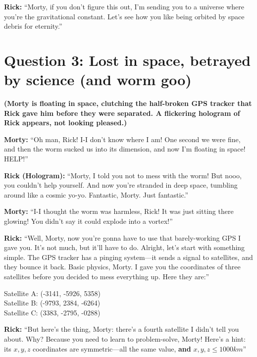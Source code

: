\documentclass[a4paper, 12pt]{exam}
\begin{document}
\bigskip

\noindent \textbf{Rick:} “Morty, if you don’t figure this out, I’m sending you to a universe where you’re the gravitational constant. Let’s see how you like being orbited by space debris for eternity.”

	
	\pagebreak
	

\section*{Question 3: Lost in space, betrayed by science (and worm goo)}

\noindent \textbf{(Morty is floating in space, clutching the half-broken GPS tracker that Rick gave him before they were separated. A flickering hologram of Rick appears, not looking pleased.)}

\bigskip
\noindent \textbf{Morty:} “Oh man, Rick! I-I don’t know where I am! One second we were fine, and then the worm sucked us into its dimension, and now I’m floating in space! HELP!” \bigskip

\noindent \textbf{Rick (Hologram):} “Morty, I told you not to mess with the worm! But nooo, you couldn’t help yourself. And now you’re stranded in deep space, tumbling around like a cosmic yo-yo. Fantastic, Morty. Just fantastic.” \bigskip

\noindent \textbf{Morty:} “I-I thought the worm was harmless, Rick! It was just sitting there glowing! You didn’t say it could explode into a vortex!” 

\bigskip

\noindent \textbf{Rick:} “Well, Morty, now you’re gonna have to use that barely-working GPS I gave you. It’s not much, but it’ll have to do. Alright, let’s start with something simple. The GPS tracker has a pinging system—it sends a signal to satellites, and they bounce it back. Basic physics, Morty. I gave you the coordinates of three satellites before you decided to mess everything up. Here they are:”

\begin{center}
Satellite A: (-3141, -5926, 5358) \\
Satellite B: (-9793, 2384, -6264) \\
Satellite C: (3383, -2795, -0288)
\end{center}

\noindent \textbf{Rick:} “But here’s the thing, Morty: there’s a fourth satellite I didn’t tell you about. Why? Because you need to learn to problem-solve, Morty! Here’s a hint: its \(x, y, z\) coordinates are symmetric—all the same value, \textbf{and} $x, y, z \leq 1000 km$” 
\end{document}

